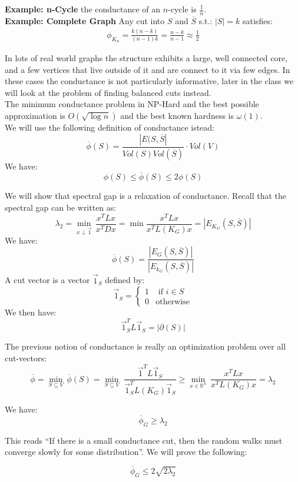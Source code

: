 \documentclass[11pt]{article}
\begin{document}
\textbf{Example: n-Cycle} the conductance of an $n$-cycle is $\frac{1}{n}$.\\

\textbf{Example: Complete Graph} 
Any cut into $S$ and $\overline{S}$ s.t.: $|S| = k$ satisfies:
\begin{align*}
    \phi_{K_n} = \frac{k(n-k)}{(n-1)k} = \frac{n-k}{n-1} \approx \frac{1}{2}
\end{align*}

In lots of real world graphs the structure exhibits a large, well connected core, and a few vertices that live outside of it and are connect to it via few edges. In these cases the conductance is not particularly informative, later in the class we will look at the problem of finding balanced cuts instead.\\

The minimum conductance problem in NP-Hard and the best possible approximation is $O(\sqrt{\log n})$ and the best known hardness is $\omega(1)$.\\

We will use the following definition of conductance istead:
\[
    \overline{\phi}(S) = \frac{|E(S,\overline{S}|}{Vol(S)Vol(\overline{S})} \cdot Vol(V)
\]
We have:
\[
    \phi(S) \leq \overline{\phi}(S) \leq 2 \phi(S)
\]

We will show that spectral gap is a relaxation of conductance. Recall that the spectral gap can be written as:
\[
    \lambda_2 = \underset{x \perp \vec{1}}{\min}\,\frac{x^TLx}{x^TDx} = \min \frac{x^TLx}{x^TL(K_G)x} = |E_{K_G}(S,\overline{S})|
\]
We have:
\[
    \overline{\phi}(S) = \frac{|E_G(S,\overline{S})|}{|E_{k_G}(S,\overline{S})|}
\]
A cut vector is a vector $\vec{1}_S$ defined by:
\[
    \vec{1}_S = \begin{cases} 1 & \text{ if }i\in S\\
    0 &\text{otherwise}
    \end{cases}
\]
We then have:
\[
    \vec{1}_S^TL\vec{1}_S = |\partial(S)|
\]

The previous notion of conductance is really an optimization problem over all cut-vectors:
\[
    \overline{\phi} = \underset{S \subseteq V}{\min}\, \overline{\phi}(S) = \underset{S \subseteq V}{\min}\; \frac{\vec{1}^T L \vec{1}_S}{\vec{1}_S^TL(K_G)\vec{1}_S} \geq \underset{x \in \mathbb{R}^n}{\min}\, \frac{x^T L x}{x^TL(K_G)x} = \lambda_2
\]

\begin{theorem}
We have:
\[
    \overline{\phi}_G \geq \lambda_2
\]
\end{theorem}
This reads ``If there is a small conductance cut, then the random walks must converge slowly for some distribution''. We will prove the following:

\begin{theorem}
\[
    \overline{\phi}_G \leq 2 \sqrt{2 \lambda_2}
\] 
\end{theorem}
\end{document}
